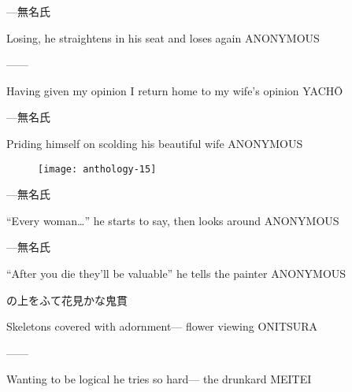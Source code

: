 \begin{haiku}
    {---}\hfill{\FH 無名氏}

    \vin{} Losing,
    \vin{} \vin{} he straightens in his seat
    \vin{} \vin{} \vin{} and loses again \hspace{\fill} ANONYMOUS
\end{haiku}

\begin{haiku}
   ---\hfill{---}

    \vin{} Having given my opinion
    \vin{} \vin{} I return home to
    \vin{} \vin{} \vin{} my wife's opinion \hspace{\fill} YACH\={O}
\end{haiku}

\begin{haiku}
    {---}\hfill{\FH 無名氏}

    \vin{} Priding himself
    \vin{} \vin{} on scolding
    \vin{} \vin{} \vin{} his beautiful wife \hspace{\fill} ANONYMOUS
\end{haiku}

\begin{figure}
    \texttt{[image: anthology-15]}
\end{figure}

\begin{haiku}
    {---}\hfill{\FH 無名氏}

    \vin{} ``Every woman\ldots''
    \vin{} \vin{} he starts to say,
    \vin{} \vin{} \vin{} then looks around \hspace{\fill} ANONYMOUS
\end{haiku}

\begin{haiku}
    {---}\hfill{\FH 無名氏}

    \vin{} ``After you die
    \vin{} \vin{} they'll be valuable''
    \vin{} \vin{} \vin{} he tells the painter \hspace{\fill} ANONYMOUS
\end{haiku}

\begin{haiku}
    {\FH {}の上をふて花見かな}\hfill{\FH 鬼貫}

    \vin{} Skeletons
    \vin{} \vin{} covered with adornment---
    \vin{} \vin{} \vin{} flower viewing \hspace{\fill} ONITSURA
\end{haiku}

\begin{haiku}
   ---\hfill{---}

    \vin{} Wanting to be logical
    \vin{} \vin{} he tries so hard---
    \vin{} \vin{} \vin{} the drunkard \hspace{\fill} MEITEI
\end{haiku}

